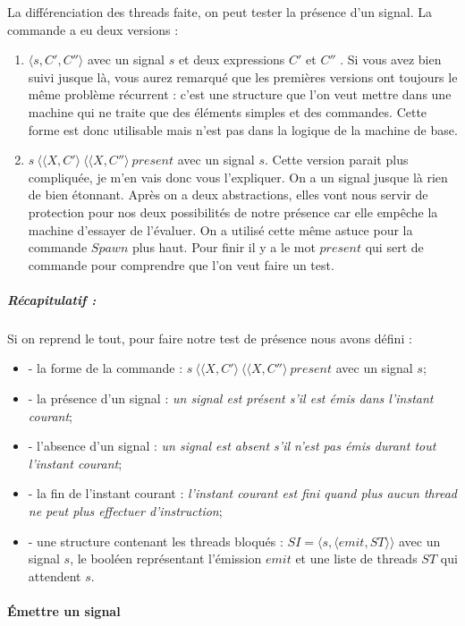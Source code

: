 \documentclass[10pt,a4paper]{report}
\begin{document}
	La différenciation des threads faite, on peut tester la présence d'un signal. La commande a eu deux versions :
	\begin{enumerate}
		\item $\langle s,C',C''\rangle$ avec un signal $s$ et deux expressions $C'$ et $C''$ . Si vous avez bien suivi jusque là, vous aurez remarqué que les premières versions ont toujours le même problème récurrent : c'est une structure que l'on veut mettre dans une machine qui ne traite que des éléments simples et des commandes. Cette forme est donc utilisable mais n'est pas dans la logique de la machine de base.
		\item $s~\langle\langle X,C'\rangle~\langle\langle X,C''\rangle~present$ avec un signal $s$. Cette version parait plus compliquée, je m'en vais donc vous l'expliquer. On a un signal jusque là rien de bien étonnant. Après on a deux abstractions, elles vont nous servir de protection pour nos deux possibilités de notre présence car elle empêche la machine d'essayer de l'évaluer. On a utilisé cette même astuce pour la commande $Spawn$ plus haut. Pour finir il y a le mot $present$ qui sert de commande pour comprendre que l'on veut faire un test.
	\end{enumerate} 
	\bigbreak
	
	
	\subparagraph{Récapitulatif :} Si on reprend le tout, pour faire notre test de présence nous avons défini :
	\begin{itemize}
		\item[] - la forme de la commande : $s~\langle\langle X,C'\rangle~\langle\langle X,C''\rangle~present$ avec un signal $s$;
		\item[] - la présence d'un signal : \textit{un signal est présent s'il est émis dans l'instant courant};
		\item[] - l'absence d'un signal : \textit{un signal est absent s'il n'est pas émis durant tout l'instant courant};
		\item[] - la fin de l'instant courant : \textit{l'instant courant est fini quand plus aucun thread ne peut plus effectuer d'instruction};
		\item[] - une structure contenant les threads bloqués : $SI = \langle s , \langle emit , ST \rangle\rangle$ avec un signal $s$, le booléen représentant l'émission $emit$ et une liste de threads $ST$ qui attendent $s$.
	\end{itemize}
	\bigbreak
	\bigbreak
	
	
	
	
	\paragraph{Émettre un signal}
	
\end{document}
